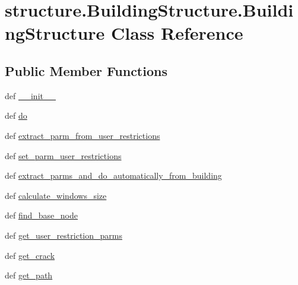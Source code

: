 \hypertarget{classstructure_1_1_building_structure_1_1_building_structure}{\section{structure.\-Building\-Structure.\-Building\-Structure Class Reference}
\label{classstructure_1_1_building_structure_1_1_building_structure}
}
\subsection*{Public Member Functions}
\begin{DoxyCompactItemize}
\item 
def \hyperlink{classstructure_1_1_building_structure_1_1_building_structure_a6d290f02876c685c75e65766f1a5aecc}{\-\_\-\-\_\-init\-\_\-\-\_\-}
\item 
def \hyperlink{classstructure_1_1_building_structure_1_1_building_structure_a6a4e2df26c051c88463b904321618ed2}{do}
\item 
def \hyperlink{classstructure_1_1_building_structure_1_1_building_structure_ae510efc31b0b79c95422a43492fd4edd}{extract\-\_\-parm\-\_\-from\-\_\-user\-\_\-restrictions}
\item 
def \hyperlink{classstructure_1_1_building_structure_1_1_building_structure_ae9f1b4c4b31322a69c280492c2a5b6ea}{set\-\_\-parm\-\_\-user\-\_\-restrictions}
\item 
def \hyperlink{classstructure_1_1_building_structure_1_1_building_structure_af0b3347d5ddd969eded2104ad6a18373}{extract\-\_\-parms\-\_\-and\-\_\-do\-\_\-automatically\-\_\-from\-\_\-building}
\item 
def \hyperlink{classstructure_1_1_building_structure_1_1_building_structure_ac7af3cf8976df0a8f9475bec04d378c8}{calculate\-\_\-windows\-\_\-size}
\item 
def \hyperlink{classstructure_1_1_building_structure_1_1_building_structure_aedb347a723cbb4e857dfc68190358675}{find\-\_\-base\-\_\-node}
\item 
def \hyperlink{classstructure_1_1_building_structure_1_1_building_structure_a872c3c41a7c7905a7e57d66ba8ab35b5}{get\-\_\-user\-\_\-restriction\-\_\-parms}
\item 
def \hyperlink{classstructure_1_1_building_structure_1_1_building_structure_ab6ae64c12322457de227b4b271f657c8}{get\-\_\-crack}
\item 
def \hyperlink{classstructure_1_1_building_structure_1_1_building_structure_a217a779930524dca5bfa2408b0f15260}{get\-\_\-path}

\end{DoxyCompactItemize}
